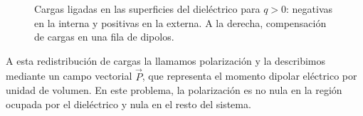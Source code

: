 \documentclass[11pt]{article}
\begin{document}
\begin{figure}
{%
}
\caption{Cargas ligadas en las superficies del dieléctrico para
$q>0$: negativas en la interna y positivas en la externa.
A la derecha, compensación de cargas en una fila de dipolos.}
\label{fig:polarizacion}
\end{figure}

A esta redistribución de cargas la llamamos polarización y la
describimos mediante un campo vectorial $\vec P$, que representa
el momento dipolar eléctrico por unidad de volumen. En este
problema, la polarización es no nula en la región ocupada por
el dieléctrico y nula en el resto del sistema.
\end{document}
